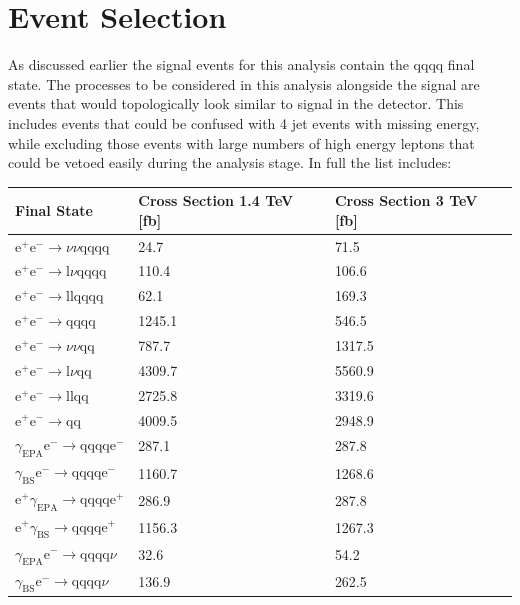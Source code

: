 \section{Event Selection}
As discussed earlier the signal events for this analysis contain the \nu{\nu}qqqq final state. The processes to be considered in this analysis alongside the signal are events that would topologically look similar to signal in the detector. This includes events that could be confused with 4 jet events with missing energy, while excluding those events with large numbers of high energy leptons that could be vetoed easily during the analysis stage. In full the list includes:

\begin{table}[h!]
\centering
\begin{tabular}{ l l l}
\hline
Final State & Cross Section 1.4 TeV [fb] & Cross Section 3 TeV [fb]  \\ 
\hline
$\text{e}^{+}\text{e}^{-} \rightarrow \nu{\nu}\text{qqqq}$ & 24.7 & 71.5 \\
$\text{e}^{+}\text{e}^{-} \rightarrow \text{l}\nu\text{qqqq}$ & 110.4 & 106.6 \\
$\text{e}^{+}\text{e}^{-} \rightarrow \text{llqqqq}$ & 62.1 & 169.3 \\
$\text{e}^{+}\text{e}^{-} \rightarrow \text{qqqq}$ & 1245.1 & 546.5 \\
$\text{e}^{+}\text{e}^{-} \rightarrow \nu{\nu}\text{qq}$ & 787.7 & 1317.5 \\
$\text{e}^{+}\text{e}^{-} \rightarrow \text{l}\nu\text{qq}$ & 4309.7 & 5560.9 \\
$\text{e}^{+}\text{e}^{-} \rightarrow \text{llqq}$ & 2725.8 & 3319.6 \\
$\text{e}^{+}\text{e}^{-} \rightarrow \text{qq}$ & 4009.5 & 2948.9 \\
$\gamma_{\text{EPA}}\text{e}^{-} \rightarrow \text{qqqq}\text{e}^{-}$ & 287.1 & 287.8 \\
$\gamma_{\text{BS}}\text{e}^{-} \rightarrow \text{qqqq}\text{e}^{-}$ & 1160.7 & 1268.6 \\
$\text{e}^{+}\gamma_{\text{EPA}} \rightarrow \text{qqqq}\text{e}^{+}$ & 286.9 & 287.8 \\
$\text{e}^{+}\gamma_{\text{BS}} \rightarrow \text{qqqq}\text{e}^{+}$ & 1156.3 & 1267.3 \\
$\gamma_{\text{EPA}}\text{e}^{-} \rightarrow \text{qqqq}\nu$ & 32.6 & 54.2 \\
$\gamma_{\text{BS}}\text{e}^{-} \rightarrow \text{qqqq}\nu$ & 136.9 & 262.5 \\

\end{tabular}
\end{table}

